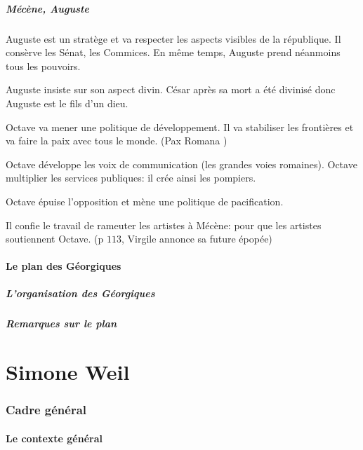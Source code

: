 \documentclass[a4paper, 11pt, hidelinks]{article}
\begin{document}
\subsubsection{Mécène, Auguste}

Auguste est un stratège et va respecter les aspects visibles de la république. Il consèrve les Sénat, les Commices. En même temps, Auguste prend
néanmoins tous les pouvoirs.


Auguste insiste sur son aspect divin. César après sa mort a été divinisé donc Auguste est le fils d'un dieu.


Octave va mener une politique de développement. Il va stabiliser les frontières et va faire la paix avec tous le monde. (\og Pax Romana \fg)


Octave développe les voix de communication (les grandes voies romaines). Octave multiplier les services publiques: il crée ainsi les pompiers.


Octave épuise l'opposition et mène une politique de pacification.


Il confie le travail de rameuter les artistes à Mécène: pour que les artistes soutiennent Octave. (p $113$, Virgile annonce sa future épopée)



\subsection{Le plan des Géorgiques}

\subsubsection{L'organisation des Géorgiques}






\subsubsection{Remarques sur le plan}

\part{Simone Weil}


\section{Cadre général}

\subsection{Le contexte général}
\end{document}
